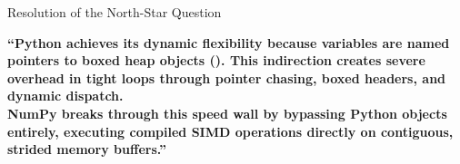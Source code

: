 \begin{frame}{Resolution of the North-Star Question}
  \begin{center}
    \vspace{0.20cm}
    \begin{tcolorbox}[enhanced,arc=2mm,boxrule=.6pt,colback=UpGradMist,colframe=UpGradRule,
      borderline west={3.5pt}{0pt}{AWSEmerald},left=5mm,right=5mm,top=4mm,bottom=4mm,width=0.94\linewidth]
      {\small\bfseries\color{UpGradNight}
        “Python achieves its dynamic flexibility because variables are named pointers to boxed heap objects (). This indirection creates severe overhead in tight loops through pointer chasing, boxed headers, and dynamic dispatch.\\[6pt]
        NumPy breaks through this speed wall by bypassing Python objects entirely, executing compiled SIMD operations directly on contiguous, strided memory buffers.”
      }
    \end{tcolorbox}
  \end{center}
  \vfill
\end{frame}

